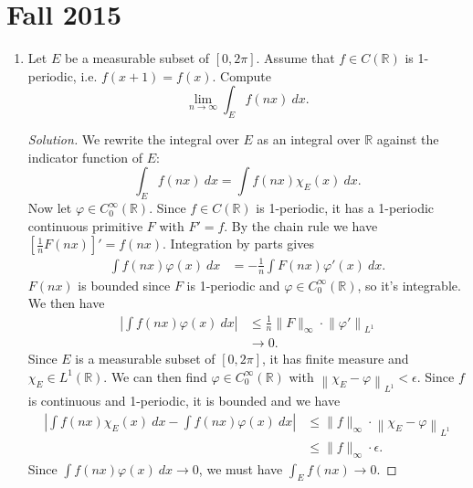 \documentclass[11pt,letterpaper]{report}
\newcommand{\reals}{\mathbb{R}}
\newcommand{\Lp}[2]{\left\|{#1}\right\|_{L^{#2}}}
\newenvironment{solution}
{\begin{proof}[Solution]}
{\end{proof}}
\begin{document}
\section{Fall 2015}
\begin{enumerate}
	\item Let $E$ be a measurable subset of $[0, 2\pi]$. Assume that $f\in C(\reals)$ is 1-periodic, i.e. $f(x+1) = f(x)$. Compute
	\[
	\lim_{n\to \infty}\int_Ef(nx)\ dx.
	\]
	\begin{solution}
		We rewrite the integral over $E$ as an integral over $\reals$ against the indicator function of $E$:
		\[
		\int_Ef(nx)\ dx = \int f(nx)\chi_E(x)\ dx.
		\]
		Now let $\varphi\in C^\infty_0(\reals)$. Since $f\in C(\reals)$ is 1-periodic, it has a 1-periodic continuous primitive $F$ with $F' = f$. By the chain rule we have $[\frac{1}{n}F(nx)]' = f(nx)$. Integration by parts gives
		\begin{align*}
		\int f(nx)\varphi(x)\ dx&= -\frac{1}{n}\int F(nx)\varphi'(x)\ dx.
		\end{align*}
		$F(nx)$ is bounded since $F$ is 1-periodic and $\varphi\in C^\infty_0(\reals)$, so it's integrable. We then have
		\begin{align*}
			\left|\int f(nx)\varphi(x)\ dx\right|& \leq \frac{1}{n}\|F\|_\infty\cdot \Lp{\varphi'}{1}\\
			&\to 0.
		\end{align*}
		Since $E$ is a measurable subset of $[0,2\pi]$, it has finite measure and $\chi_E\in L^1(\reals)$. We can then find $\varphi\in C_0^\infty(\reals)$ with $\Lp{\chi_E-\varphi}{1}<\epsilon$. Since $f$ is continuous and 1-periodic, it is bounded and we have
		\begin{align*}
			\left|\int f(nx)\chi_E(x)\ dx - \int f(nx)\varphi(x)\ dx\right| &\leq \|f\|_\infty\cdot \Lp{\chi_E-\varphi}{1}\\
			&\leq \|f\|_\infty\cdot \epsilon.
		\end{align*}
		Since $\int f(nx)\varphi(x)\ dx\to 0$, we must have $\int_Ef(nx)\to 0$.
	\end{solution}


\end{enumerate}
\end{document}
